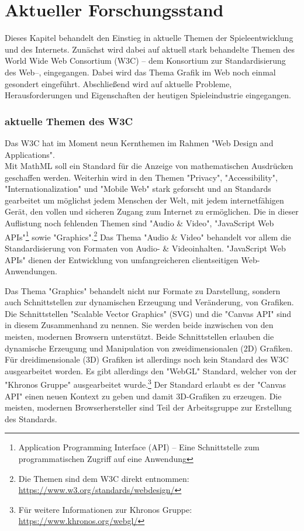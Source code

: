\section{Aktueller Forschungsstand}
\label{sec:aktueller_forschungsstand}
\noindent Dieses Kapitel behandelt den Einstieg in aktuelle Themen der Spieleentwicklung und des Internets. Zunächst wird dabei auf aktuell stark behandelte Themen des World Wide Web Consortium (W3C) -- dem Konsortium zur Standardisierung des Web--, eingegangen. Dabei wird das Thema Grafik im Web noch einmal gesondert eingeführt. Abschließend wird auf aktuelle Probleme, Herausforderungen und Eigenschaften der heutigen Spieleindustrie eingegangen.

\subsubsection{aktuelle Themen des W3C}
Das W3C hat im Moment neun Kernthemen im Rahmen "Web Design and Applications".\\
Mit MathML soll ein Standard für die Anzeige von mathematischen Ausdrücken geschaffen werden. Weiterhin wird in den Themen "Privacy", "Accessibility", "Internationalization" und "Mobile Web" stark geforscht und an Standards gearbeitet um möglichst jedem Menschen der Welt, mit jedem internetfähigen Gerät, den vollen und sicheren Zugang zum Internet zu ermöglichen. Die in dieser Auflistung noch fehlenden Themen sind "Audio \& Video", "JavaScript Web APIs"\footnote{Application Programming Interface (API) -- Eine Schnittstelle zum programmatischen Zugriff auf eine Anwendung} sowie "Graphics".\footnote{Die Themen sind dem W3C direkt entnommen: \url{https://www.w3.org/standards/webdesign/}}
Das Thema "Audio \& Video" behandelt vor allem die Standardisierung von Formaten von Audio- \& Videoinhalten. "JavaScript Web APIs" dienen der Entwicklung von umfangreicheren clientseitigen Web-Anwendungen.

\noindent Das Thema "Graphics" behandelt nicht nur Formate zu Darstellung, sondern auch Schnittstellen zur dynamischen Erzeugung und Veränderung, von Grafiken. Die Schnittstellen "Scalable Vector Graphics" (SVG) und die "Canvas API" sind in diesem Zusammenhand zu nennen. Sie werden beide inzwischen von den meisten, modernen Browsern unterstützt. Beide Schnittstellen erlauben die dynamische Erzeugung und Manipulation von zweidimensionalen (2D) Grafiken. Für dreidimensionale (3D) Grafiken ist allerdings noch kein Standard des W3C ausgearbeitet worden. Es gibt allerdings den "WebGL" Standard, welcher von der "Khronos Gruppe" ausgearbeitet wurde.\footnote{Für weitere Informationen zur Khronos Gruppe: \url{https://www.khronos.org/webgl/}} Der Standard erlaubt es der "Canvas API" einen neuen Kontext zu geben und damit 3D-Grafiken zu erzeugen. Die meisten, modernen Browserhersteller sind Teil der Arbeitsgruppe zur Erstellung des Standards.


